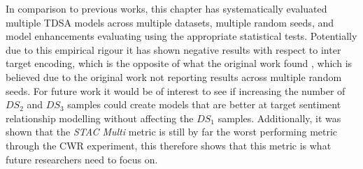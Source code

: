 In comparison to previous works, this chapter has systematically evaluated multiple TDSA models across multiple datasets, multiple random seeds, and model enhancements evaluating using the appropriate statistical tests. Potentially due to this empirical rigour it has shown negative results with respect to inter target encoding, which is the opposite of what the original work found \citep{hazarika-etal-2018-modeling}, which is believed due to the original work not reporting results across multiple random seeds. For future work it would be of interest to see if increasing the number of $DS_2$ and $DS_3$ samples could create models that are better at target sentiment relationship modelling without affecting the $DS_1$ samples. Additionally, it was shown that the \textit{STAC Multi} metric is still by far the worst performing metric through the CWR experiment, this therefore shows that this metric is what future researchers need to focus on.   %





